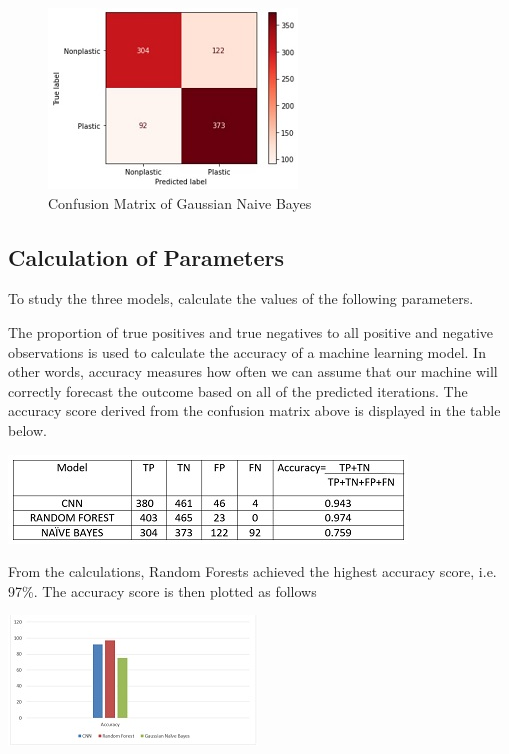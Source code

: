 \begin{figure}
    \centering
    \includegraphics{ngb-cm1.jpg}
    \caption{Confusion Matrix of Gaussian Naive Bayes}
    \label{Confusion Matrix of Gaussian Naive Bayes}
\end{figure}
\newpage   
\subsection{Calculation of Parameters}
To study the three models, calculate the values of the following parameters.\\
\par The proportion of true positives and true negatives to all positive and negative observations is used to calculate the accuracy of a machine learning model. In other words, accuracy measures how often we can assume that our machine will correctly forecast the outcome based on all of the predicted iterations. The accuracy score derived from the confusion matrix above is displayed in the table below.\\
\begin{center}
    \includegraphics[]{tb1.jpg}
\end{center}
\par From the calculations, Random Forests achieved the highest accuracy score, i.e.
97\%. The accuracy score is then plotted as follows
\begin{center}
    \includegraphics[]{acc2.jpg}
\end{center}
